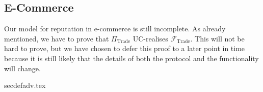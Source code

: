 \subsection{E-Commerce}
  Our model for reputation in e-commerce is still incomplete. As already mentioned, we
  have to prove that $\Pi_{\mathrm{Trade}}$ UC-realises $\mathcal{F}_{\mathrm{Trade}}$.
  This will not be hard to prove, but we have chosen to defer this proof to a later point
  in time because it is still likely that the details of both the protocol and the
  functionality will change.

  {secdefadv.tex}
